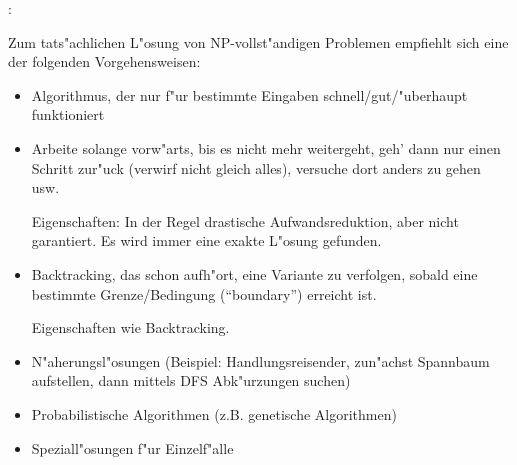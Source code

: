 \remark:{
  Zum tats"achlichen L"osung von NP-vollst"andigen Problemen empfiehlt sich
  eine der folgenden Vorgehensweisen:
  \begin{itemize}
    \item Algorithmus, der nur f"ur bestimmte Eingaben schnell/gut/"uberhaupt
      funktioniert 
    \item \textbf{} Arbeite solange vorw"arts, bis 
      es nicht mehr weitergeht, geh' dann nur einen Schritt zur"uck 
      (verwirf nicht gleich alles), versuche dort anders zu gehen usw.
      
      Eigenschaften: In der Regel drastische Aufwandsreduktion, aber nicht
        garantiert. Es wird immer eine exakte L"osung gefunden.
    \item \textbf{} Backtracking, das schon 
      aufh"ort, eine Variante zu verfolgen, sobald eine bestimmte 
      Grenze/Bedingung (``boundary'') erreicht ist.
      
      Eigenschaften wie Backtracking.
    \item N"aherungsl"osungen (Beispiel: Handlungsreisender, zun"achst
      Spannbaum aufstellen, dann mittels DFS Abk"urzungen suchen)
    \item Probabilistische Algorithmen (z.B. genetische Algorithmen)
    \item Speziall"osungen f"ur Einzelf"alle
  \end{itemize}
}
